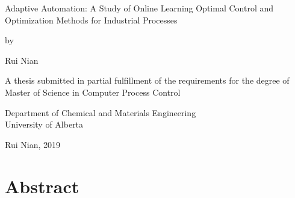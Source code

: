 \documentclass[12pt]{report}
\begin{document}
\begin{titlepage}
    \begin{center}
    
        \vspace*{1.1cm}
        
        \LARGE
        Adaptive Automation: A Study of Online Learning Optimal Control and Optimization Methods for Industrial Processes \\
        
        \vspace{1cm}
        
        \normalsize by \\
        
        \vspace{1cm}
        
        \large Rui Nian \\
        
        \vspace{3cm}
        
        A thesis submitted in partial fulfillment of the requirements for the degree of \\
        \vspace{1cm}
        Master of Science in Computer Process Control \\
        
        \vspace{3.5cm}
        
        Department of Chemical and Materials Engineering \\
        University of Alberta \\
        
        \vspace{1cm}
        
        \textcopyright \hspace{1mm} Rui Nian, 2019 \\
        

    \end{center}
\end{titlepage}



\chapter*{Abstract}
\end{document}
